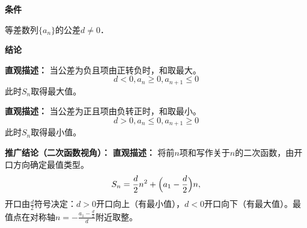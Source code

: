 \begin{statementbox}
	\textbf{\textcolor{CStatement}{条件}}
	\begin{description}[style=nextline, leftmargin=2.8em, labelsep=0.5em, itemsep=0.35em]
		\item[\textbf{\textcolor{CStatement}{条件 1（公差非零）：}}]
			等差数列$\{a_n\}$的公差$d \neq 0$．
	\end{description}
	\textbf{\textcolor{CStatement}{结论}}
	\begin{description}[style=nextline, leftmargin=2.8em, labelsep=0.5em, itemsep=0.45em]
		\item[\textbf{\textcolor{CStatement}{结论一（最大值条件）：}}]
			\textbf{\textcolor{CStatement}{直观描述：}}
			当公差为负且项由正转负时，和取最大。
			\[
				d<0, a_n\ge 0, a_{n+1}\le 0
			\]
			此时$S_n$取得最大值。
		\item[\textbf{\textcolor{CStatement}{结论二（最小值条件）：}}]
			\textbf{\textcolor{CStatement}{直观描述：}}
			当公差为正且项由负转正时，和取最小。
			\[
				d>0, a_n\le 0, a_{n+1}\ge 0
			\]
			此时$S_n$取得最小值。
	\end{description}

	\medskip
	\textbf{\textcolor{CStatement}{推广结论（二次函数视角）：}}
	\textbf{\textcolor{CStatement}{直观描述：}}
	将前$n$项和写作关于$n$的二次函数，由开口方向确定最值类型。
	\[
		S_n = \frac{d}{2}n^2 + \Bigl(a_1-\frac{d}{2}\Bigr)n,
	\]
	开口由$\frac{d}{2}$符号决定：$d>0$开口向上（有最小值），$d<0$开口向下（有最大值）。最值点在对称轴$n=-\frac{a_1-\frac{d}{2}}{d}$附近取整。
\end{statementbox}
